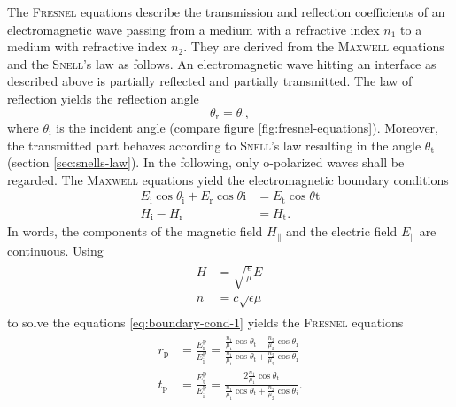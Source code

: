 \documentclass[../thesis.tex]{subfiles}
\begin{document}
        The \textsc{Fresnel} equations describe the transmission and reflection coefficients of an electromagnetic wave passing from a medium with a refractive index $n_1$ to a medium with refractive index $n_2$. They are derived from the \textsc{Maxwell} equations and the \textsc{Snell}'s law as follows. An electromagnetic wave hitting an interface as described above is partially reflected and partially transmitted. The law of reflection yields the reflection angle
        \begin{equation}
            \theta_\mathrm{r} = \theta_\mathrm{i},
        \end{equation}
        where $\theta_\mathrm{i}$ is the incident angle (compare figure \cref{fig:fresnel-equations}). Moreover, the transmitted part behaves according to \textsc{Snell}'s law resulting in the angle $\theta_\mathrm{t}$ (section \cref{sec:snells-law}). In the following, only o-polarized waves shall be regarded. The \textsc{Maxwell} equations yield the electromagnetic boundary conditions
        \begin{equation}
            \begin{split}
                E_\mathrm{i}\cos\theta_\mathrm{i} + E_\mathrm{r}\cos\theta\mathrm{i} &= E_\mathrm{t}\cos\theta\mathrm{t}    \\
                H_\mathrm{i} - H_\mathrm{r} &= H_\mathrm{t}.
                \label{eq:boundary-cond-1}
            \end{split}
        \end{equation}
        In words, the components of the magnetic field $H_\parallel$ and the electric field $E_\parallel$ are continuous. Using
        \begin{align}
            \begin{split}
                H&=\sqrt{\frac{\epsilon}{\mu}}E \\
                n&=c\sqrt{\epsilon\mu}
            \end{split}
            \label{eq:boundary-cond-2}
        \end{align}
        to solve the equations \cref{eq:boundary-cond-1} yields the \textsc{Fresnel} equations
        \begin{align}
            \begin{split}
                r_\mathrm{p} &= \frac{E_\mathrm{r}^\mathrm{p}}{E_\mathrm{i}^\mathrm{p}} = \frac{\frac{n_1}{\mu_1}\cos\theta_\mathrm{t} - \frac{n_2}{\mu_2}\cos\theta_\mathrm{i}}{\frac{n_1}{\mu_1}\cos\theta_\mathrm{t} + \frac{n_2}{\mu_2}\cos\theta_\mathrm{i}} \\
                t_\mathrm{p} &= \frac{E_\mathrm{t}^\mathrm{p}}{E_\mathrm{i}^\mathrm{p}} = \frac{2\frac{n_1}{\mu_1}\cos\theta_\mathrm{t}}{\frac{n_1}{\mu_1}\cos\theta_\mathrm{t} + \frac{n_2}{\mu_2}\cos\theta_\mathrm{i}}.
            \end{split}
            \label{eq:fresnel1}
        \end{align}
\end{document}
